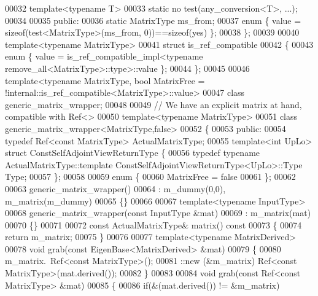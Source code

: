 \begin{DoxyCode}
00032   \textcolor{keyword}{template}<\textcolor{keyword}{typename} T>
00033   \textcolor{keyword}{static} no  test(any\_conversion<T>, ...);
00034 
00035 \textcolor{keyword}{public}:
00036   \textcolor{keyword}{static} MatrixType ms\_from;
00037   \textcolor{keyword}{enum} \{ value = \textcolor{keyword}{sizeof}(test<MatrixType>(ms\_from, 0))==\textcolor{keyword}{sizeof}(yes) \};
00038 \};
00039 
00040 \textcolor{keyword}{template}<\textcolor{keyword}{typename} MatrixType>
00041 \textcolor{keyword}{struct }is\_ref\_compatible
00042 \{
00043   \textcolor{keyword}{enum} \{ value = is\_ref\_compatible\_impl<typename remove\_all<MatrixType>::type>::value \};
00044 \};
00045 
00046 template<typename MatrixType, bool MatrixFree = !internal::is\_ref\_compatible<MatrixType>::value>
00047 \textcolor{keyword}{class }generic\_matrix\_wrapper;
00048 
00049 \textcolor{comment}{// We have an explicit matrix at hand, compatible with Ref<>}
00050 \textcolor{keyword}{template}<\textcolor{keyword}{typename} MatrixType>
00051 \textcolor{keyword}{class }generic\_matrix\_wrapper<MatrixType,false>
00052 \{
00053 \textcolor{keyword}{public}:
00054   \textcolor{keyword}{typedef} Ref<const MatrixType> ActualMatrixType;
00055   \textcolor{keyword}{template}<\textcolor{keywordtype}{int} UpLo> \textcolor{keyword}{struct }ConstSelfAdjointViewReturnType \{
00056     \textcolor{keyword}{typedef} \textcolor{keyword}{typename} ActualMatrixType::template ConstSelfAdjointViewReturnType<UpLo>::Type Type;
00057   \};
00058 
00059   \textcolor{keyword}{enum} \{
00060     MatrixFree = \textcolor{keyword}{false}
00061   \};
00062 
00063   generic\_matrix\_wrapper()
00064     : m\_dummy(0,0), m\_matrix(m\_dummy)
00065   \{\}
00066 
00067   \textcolor{keyword}{template}<\textcolor{keyword}{typename} InputType>
00068   generic\_matrix\_wrapper(\textcolor{keyword}{const} InputType &mat)
00069     : m\_matrix(mat)
00070   \{\}
00071 
00072   \textcolor{keyword}{const} ActualMatrixType& matrix()\textcolor{keyword}{ const}
00073 \textcolor{keyword}{  }\{
00074     \textcolor{keywordflow}{return} m\_matrix;
00075   \}
00076 
00077   \textcolor{keyword}{template}<\textcolor{keyword}{typename} MatrixDerived>
00078   \textcolor{keywordtype}{void} grab(\textcolor{keyword}{const} EigenBase<MatrixDerived> &mat)
00079   \{
00080     m\_matrix.~Ref<\textcolor{keyword}{const} MatrixType>();
00081     ::new (&m\_matrix) Ref<const MatrixType>(mat.derived());
00082   \}
00083 
00084   \textcolor{keywordtype}{void} grab(\textcolor{keyword}{const} Ref<const MatrixType> &mat)
00085   \{
00086     \textcolor{keywordflow}{if}(&(mat.derived()) != &m\_matrix)

\end{DoxyCode}
